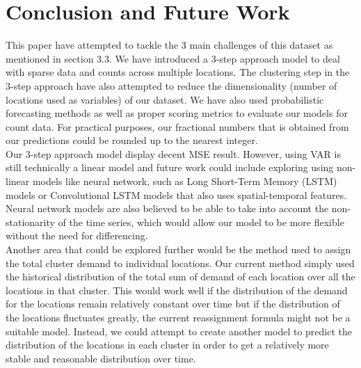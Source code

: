 \documentclass[nonblindrev,msom]{informs3} %
\begin{document}
\section{Conclusion and Future Work}

This paper have attempted to tackle the 3 main challenges of this dataset as mentioned in section 3.3. We have introduced a 3-step approach model to deal with sparse data and counts across multiple locations. The clustering step in the 3-step approach have also attempted to reduce the dimensionality (number of locations used as variables) of our dataset. We have also used probabilistic forecasting methods as well as proper scoring metrics to evaluate our models for count data. For practical purposes, our fractional numbers that is obtained from our predictions could be rounded up to the nearest integer. \\

\noindent Our 3-step approach model display decent MSE result. However, using VAR is still technically a linear model and future work could include exploring using non-linear models like neural network, such as Long Short-Term Memory (LSTM) models or Convolutional LSTM models that also uses spatial-temporal features. Neural network models are also believed to be able to take into account the non-stationarity of the time series, which would allow our model to be more flexible without the need for differencing. \\

\noindent Another area that could be explored further would be the method used to assign the total cluster demand to individual locations. Our current method simply used the historical distribution of the total sum of demand of each location over all the locations in that cluster. This would work well if the distribution of the demand for the locations remain relatively constant over time but if the distribution of the locations fluctuates greatly, the current reassignment formula might not be a suitable model. Instead, we could attempt to create another model to predict the distribution of the locations in each cluster in order to get a relatively more stable and reasonable distribution over time. 

\newpage



%
%
%
\end{document}
